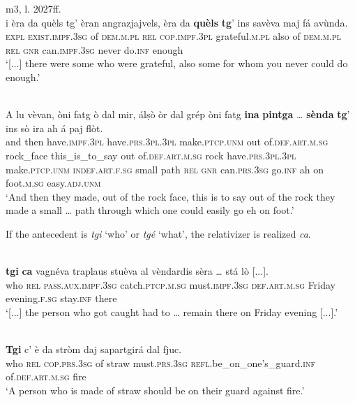 \ea
\label{relpreppar2}
 {m3, l. 2027ff.}\\
	\gll [...] i èra da quèls tg’ èran angrazjajvels, èra da \textbf{quèls} \textbf{tg}’ ins savèva maj fá avùnda.\\
 {} \textsc{expl} \textsc{\textbf{}exist.impf.3sg} of \textsc{dem.m.pl} \textsc{rel} \textsc{cop.impf.3pl} grateful.\textsc{m.pl} also of \textsc{dem.m.pl} \textsc{rel} \textsc{gnr} can.\textsc{impf.3sg} never do.\textsc{inf} enough\\
\glt `[...] there were some who were grateful, also some for whom you never could do enough.'
\z

\ea
\label{relpreptras}
\\
\gll  A lu vèvan, òni fatg ò dal mir, álṣò òr dal grép òni fatg \textbf{ina} \textbf{pintga} …  \textbf{sènda} \textbf{tg}’ ins sò ira ah á paj flòt.\\
and then have.\textsc{impf.3pl} have.\textsc{prs.3pl.3pl} make.\textsc{ptcp.unm} out of.\textsc{def.art.m.sg} rock\_face this\_is\_to\_say out of.\textsc{def.art.m.sg} rock have.\textsc{prs.3pl.3pl} make.\textsc{ptcp.unm} \textsc{indef.art.f.sg} small {} path \textsc{rel} \textsc{gnr} can.\textsc{prs.3sg} go.\textsc{inf} ah on foot.\textsc{m.sg} easy.\textsc{adj.unm} \\
\glt `And then they made, out of the rock face, this is to say out of the rock they made a small … path through which one could easily go eh on foot.'
\z

If the antecedent is \textit{tgi} `who' or \textit{tgé} `what', the relativizer is realized \textit{ca}.

\ea\label{}
\\
\gll    [...] \textbf{tgi} \textbf{ca} vagnéva traplaus stuèva al vèndardis sèra … stá lò [...].\\
{}  who \textsc{rel} \textsc{pass.aux.impf.3sg} catch.\textsc{ptcp.m.sg} must.\textsc{impf.3sg} \textsc{def.art.m.sg} Friday evening.\textsc{f.sg} {} stay.\textsc{inf} there\\
\glt `[...] the person who got caught had to … remain there on Friday evening [...].'
\z

\ea\label{}
\\
\gll   \textbf{Tgi} {c}’ è da stròm daj sapartgirá dal fjuc.\\
     who \textsc{rel} \textsc{cop.prs.3sg} of straw must.\textsc{prs.3sg} \textsc{refl}.be\_on\_one’s\_guard.\textsc{inf} of.\textsc{def.art.m.sg} fire\\
\glt `A person who is made of straw should be on their guard against fire.'
\z


